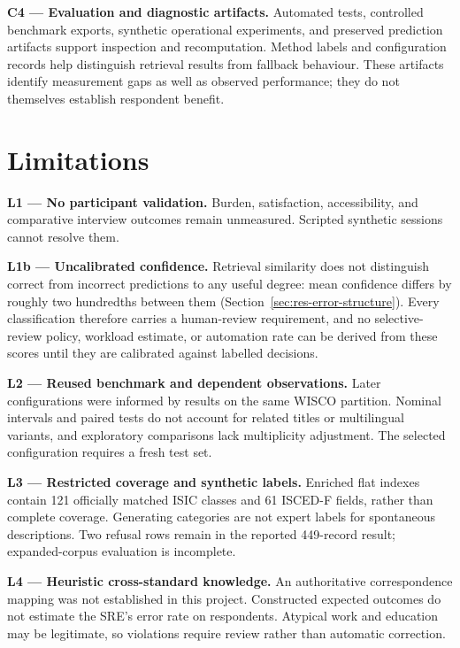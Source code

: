 \noindent\textbf{C4 --- Evaluation and diagnostic artifacts.}
Automated tests, controlled benchmark exports, synthetic operational
experiments, and preserved prediction artifacts support inspection and
recomputation. Method labels and configuration records help distinguish
retrieval results from fallback behaviour. These artifacts identify
measurement gaps as well as observed performance; they do not themselves
establish respondent benefit.

\section{Limitations}
\label{sec:conc-limitations}

\noindent\textbf{L1 --- No participant validation.}
Burden, satisfaction, accessibility, and comparative interview outcomes
remain unmeasured. Scripted synthetic sessions cannot resolve them.

\noindent\textbf{L1b --- Uncalibrated confidence.}
Retrieval similarity does not distinguish correct from incorrect
predictions to any useful degree: mean confidence differs by roughly two
hundredths between them
(Section~\ref{sec:res-error-structure}). Every classification therefore
carries a human-review requirement, and no selective-review policy,
workload estimate, or automation rate can be derived from these scores
until they are calibrated against labelled decisions.

\noindent\textbf{L2 --- Reused benchmark and dependent observations.}
Later configurations were informed by results on the same WISCO partition.
Nominal intervals and paired tests do not account for related titles or
multilingual variants, and exploratory comparisons lack multiplicity
adjustment. The selected configuration requires a fresh test set.

\noindent\textbf{L3 --- Restricted coverage and synthetic labels.}
Enriched flat indexes contain 121 officially matched ISIC classes and 61
ISCED-F fields, rather than complete coverage. Generating categories are
not expert labels for spontaneous descriptions. Two refusal rows remain
in the reported 449-record result; expanded-corpus evaluation is incomplete.

\noindent\textbf{L4 --- Heuristic cross-standard knowledge.}
An authoritative correspondence mapping was not established in this
project. Constructed expected outcomes do not estimate the SRE's error
rate on respondents. Atypical work and education may be legitimate, so
violations require review rather than automatic correction.

